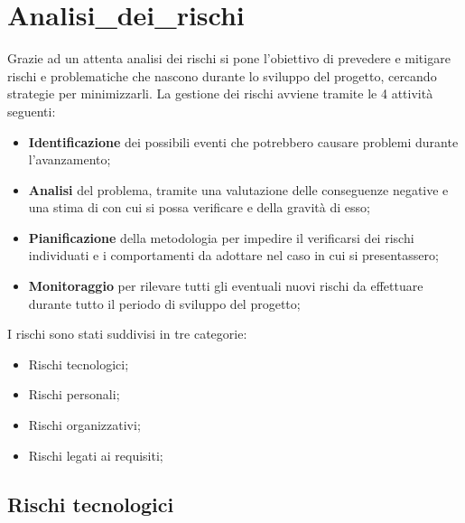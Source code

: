 \section{Analisi_dei_rischi}

Grazie ad un attenta analisi dei rischi si pone l'obiettivo di prevedere e mitigare rischi e problematiche che nascono durante lo sviluppo del progetto, cercando strategie per minimizzarli. 
La gestione dei rischi avviene tramite le 4 attività seguenti:
\begin{itemize}
	\item \textbf{Identificazione} dei possibili eventi che potrebbero causare problemi durante l'avanzamento;
	\item \textbf{Analisi} del problema, tramite una valutazione delle conseguenze negative e una stima di con cui si possa verificare e della gravità di esso;
	\item \textbf{Pianificazione} della metodologia per impedire il verificarsi dei rischi individuati e i comportamenti da adottare nel caso in cui si presentassero;
	\item \textbf{Monitoraggio} per rilevare tutti gli eventuali nuovi rischi da effettuare durante tutto il periodo di sviluppo del progetto;
\end{itemize}

I rischi sono stati suddivisi in tre categorie:
\begin{itemize}
	\item Rischi tecnologici;
	\item Rischi personali;
	\item Rischi organizzativi;
	\item Rischi legati ai requisiti;
\end{itemize}

\subsection{Rischi tecnologici}

